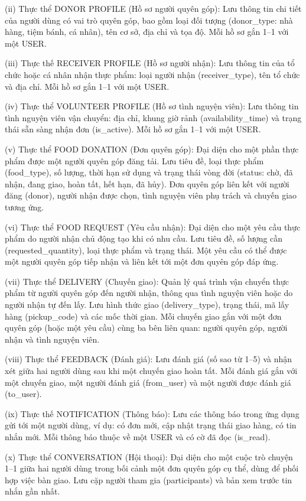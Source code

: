 \documentclass[../main.tex]{subfiles}%
\begin{document}
(ii) Thực thể DONOR PROFILE (Hồ sơ người quyên góp): Lưu thông tin chi tiết của người dùng có vai trò quyên góp, bao gồm loại đối tượng (donor\_type: nhà hàng, tiệm bánh, cá nhân), tên cơ sở, địa chỉ và tọa độ. Mỗi hồ sơ gắn 1–1 với một USER.

(iii) Thực thế RECEIVER PROFILE (Hồ sơ người nhận): Lưu thông tin của tổ chức hoặc cá nhân nhận thực phẩm: loại người nhận (receiver\_type), tên tổ chức và địa chỉ. Mỗi hồ sơ gắn 1–1 với một USER.

(iv) Thực thể VOLUNTEER PROFILE (Hồ sơ tình nguyện viên): Lưu thông tin tình nguyện viên vận chuyển: địa chỉ, khung giờ rảnh (availability\_time) và trạng thái sẵn sàng nhận đơn (is\_active). Mỗi hồ sơ gắn 1–1 với một USER.

(v) Thực thể FOOD DONATION (Đơn quyên góp): Đại diện cho một phần thực phẩm được một người quyên góp đăng tải. Lưu tiêu đề, loại thực phẩm (food\_type), số lượng, thời hạn sử dụng và trạng thái vòng đời (status: chờ, đã nhận, đang giao, hoàn tất, hết hạn, đã hủy). Đơn quyên góp liên kết với người đăng (donor), người nhận được chọn, tình nguyện viên phụ trách và chuyến giao tương ứng.

(vi) Thực thể FOOD REQUEST (Yêu cầu nhận): Đại diện cho một yêu cầu thực phẩm do người nhận chủ động tạo khi có nhu cầu. Lưu tiêu đề, số lượng cần (requested\_quantity), loại thực phẩm và trạng thái. Một yêu cầu có thể được một người quyên góp tiếp nhận và liên kết tới một đơn quyên góp đáp ứng.

(vii) Thực thể DELIVERY (Chuyến giao): Quản lý quá trình vận chuyển thực phẩm từ người quyên góp đến người nhận, thông qua tình nguyện viên hoặc do người nhận tự đến lấy. Lưu hình thức giao (delivery\_type), trạng thái, mã lấy hàng (pickup\_code) và các mốc thời gian. Mỗi chuyến giao gắn với một đơn quyên góp (hoặc một yêu cầu) cùng ba bên liên quan: người quyên góp, người nhận và tình nguyện viên.

(viii) Thực thể FEEDBACK (Đánh giá): Lưu đánh giá (số sao từ 1–5) và nhận xét giữa hai người dùng sau khi một chuyến giao hoàn tất. Mỗi đánh giá gắn với một chuyến giao, một người đánh giá (from\_user) và một người được đánh giá (to\_user).

(ix) Thực thế NOTIFICATION (Thông báo): Lưu các thông báo trong ứng dụng gửi tới một người dùng, ví dụ: có đơn mới, cập nhật trạng thái giao hàng, có tin nhắn mới. Mỗi thông báo thuộc về một USER và có cờ đã đọc (is\_read).

(x) Thực thể CONVERSATION (Hội thoại): Đại diện cho một cuộc trò chuyện 1–1 giữa hai người dùng trong bối cảnh một đơn quyên góp cụ thể, dùng để phối hợp việc bàn giao. Lưu cặp người tham gia (participants) và bản xem trước tin nhắn gần nhất.
\end{document}

